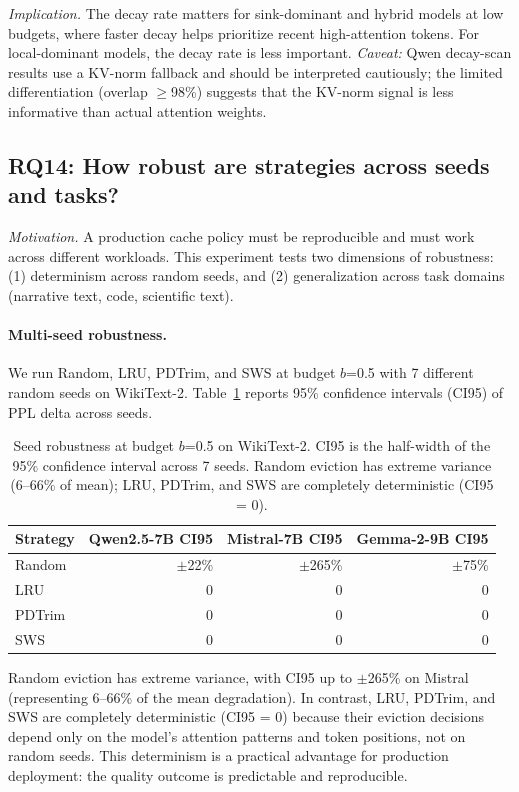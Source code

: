 \documentclass[11pt]{article}
\newcommand{\sws}{SWS}
\newcommand{\pct}{\%}
\theoremstyle{definition}
\theoremstyle{plain}
\begin{document}
\emph{Implication.}  The decay rate matters for sink-dominant and hybrid models at low budgets, where faster decay helps prioritize recent high-attention tokens.  For local-dominant models, the decay rate is less important.  \emph{Caveat:} Qwen decay-scan results use a KV-norm fallback and should be interpreted cautiously; the limited differentiation (overlap $\ge$98\pct{}) suggests that the KV-norm signal is less informative than actual attention weights.

\subsection{RQ14: How robust are strategies across seeds and tasks?}
\label{sec:rq14}

\emph{Motivation.}  A production cache policy must be reproducible and must work across different workloads.  This experiment tests two dimensions of robustness: (1) determinism across random seeds, and (2) generalization across task domains (narrative text, code, scientific text).

\paragraph{Multi-seed robustness.}  We run Random, LRU, PDTrim, and \sws{} at budget $b$=0.5 with 7 different random seeds on WikiText-2.  Table~\ref{tab:seed-robust} reports 95\pct{} confidence intervals (CI95) of PPL delta across seeds.

\begin{table}[t]
\centering
\caption{Seed robustness at budget $b$=0.5 on WikiText-2.  CI95 is the half-width of the 95\% confidence interval across 7 seeds.  Random eviction has extreme variance (6--66\pct{} of mean); LRU, PDTrim, and \sws{} are completely deterministic (CI95 = 0).}
\label{tab:seed-robust}
\small
\begin{tabular}{lrrr}
\toprule
Strategy & Qwen2.5-7B CI95 & Mistral-7B CI95 & Gemma-2-9B CI95 \\
\midrule
Random & $\pm$22\pct{} & $\pm$265\pct{} & $\pm$75\pct{} \\
LRU & 0 & 0 & 0 \\
PDTrim & 0 & 0 & 0 \\
\sws{} & 0 & 0 & 0 \\
\bottomrule
\end{tabular}
\end{table}

Random eviction has extreme variance, with CI95 up to $\pm$265\pct{} on Mistral (representing 6--66\pct{} of the mean degradation).  In contrast, LRU, PDTrim, and \sws{} are completely deterministic (CI95 = 0) because their eviction decisions depend only on the model's attention patterns and token positions, not on random seeds.  This determinism is a practical advantage for production deployment: the quality outcome is predictable and reproducible.
\end{document}
